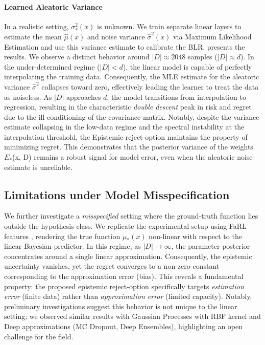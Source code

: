 \paragraph{Learned Aleatoric Variance} In a realistic setting, $\sigma^{2}_*(x)$ is unknown. We train separate linear layers to estimate the mean $\hat{\mu}(x)$ and noise variance $\hat{\sigma}^2(x)$ via Maximum Likelihood Estimation and use this variance estimate to calibrate the BLR.  presents the results. We observe a distinct behavior around $|D| \approx 2048$ samples ($|D| \approx d$). In the under-determined regime ($|D| < d$), the linear model is capable of perfectly interpolating the training data. Consequently, the MLE estimate for the aleatoric variance $\hat{\sigma}^2$ collapses toward zero, effectively leading the learner to treat the data as noiseless. As $|D|$ approaches $d$, the model transitions from interpolation to regression, resulting in the characteristic \textit{double descent} peak in risk and regret due to the ill-conditioning of the covariance matrix. Notably, despite the variance estimate collapsing in the low-data regime and the spectral instability at the interpolation threshold, the Epistemic reject-option maintains the property of minimizing regret. This demonstrates that the posterior variance of the weights $E_*$(x, D) remains a robust signal for model error, even when the aleatoric noise estimate is unreliable.

\subsection{Limitations under Model Misspecification}
We further investigate a \textit{misspecified} setting where the ground-truth function lies outside the hypothesis class. We replicate the experimental setup using FaRL features \cite{Zheng_2022_CVPR}, rendering the true function $\mu_*(x)$ non-linear with respect to the linear Bayesian predictor. In this regime, as $|D| \to \infty$, the parameter posterior concentrates around a single linear approximation. Consequently, the epistemic uncertainty vanishes, yet the regret converges to a non-zero constant corresponding to the approximation error (bias). This reveals a fundamental property: the proposed epistemic reject-option specifically targets \textit{estimation error} (finite data) rather than \textit{approximation error} (limited capacity). Notably, preliminary investigations suggest this behavior is not unique to the linear setting; we observed similar results with Gaussian Processes with RBF kernel and Deep approximations (MC Dropout, Deep Ensembles), highlighting an open challenge for the field.